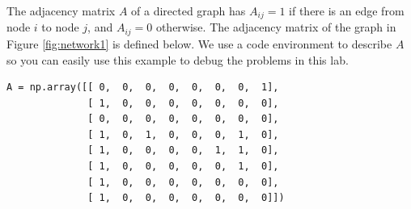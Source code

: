 The adjacency matrix $A$ of a directed graph has $A_{ij}=1$ if there is an edge from node $i$ to node $j$, and $A_{ij}=0$ otherwise.
The adjacency matrix of the graph in Figure \ref{fig:network1} is defined below.
We use a code environment to describe $A$ so you can easily use this example to debug the problems in this lab.
\begin{lstlisting}
A = np.array([[ 0,  0,  0,  0,  0,  0,  0,  1],
              [ 1,  0,  0,  0,  0,  0,  0,  0],
              [ 0,  0,  0,  0,  0,  0,  0,  0],
              [ 1,  0,  1,  0,  0,  0,  1,  0],
              [ 1,  0,  0,  0,  0,  1,  1,  0],
              [ 1,  0,  0,  0,  0,  0,  1,  0],
              [ 1,  0,  0,  0,  0,  0,  0,  0],
              [ 1,  0,  0,  0,  0,  0,  0,  0]])
\end{lstlisting}

